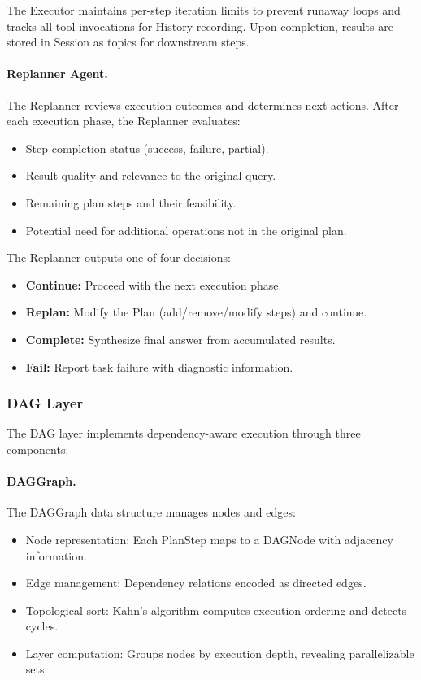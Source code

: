 \documentclass{article}
\theoremstyle{definition}
\begin{document}
The Executor maintains per-step iteration limits to prevent runaway loops and tracks all tool invocations for History recording. Upon completion, results are stored in Session as topics for downstream steps.

\paragraph{Replanner Agent.}
The Replanner reviews execution outcomes and determines next actions. After each execution phase, the Replanner evaluates:
\begin{itemize}[leftmargin=1.5em]
    \item Step completion status (success, failure, partial).
    \item Result quality and relevance to the original query.
    \item Remaining plan steps and their feasibility.
    \item Potential need for additional operations not in the original plan.
\end{itemize}

The Replanner outputs one of four decisions:
\begin{itemize}[leftmargin=1.5em]
    \item \textbf{Continue:} Proceed with the next execution phase.
    \item \textbf{Replan:} Modify the Plan (add/remove/modify steps) and continue.
    \item \textbf{Complete:} Synthesize final answer from accumulated results.
    \item \textbf{Fail:} Report task failure with diagnostic information.
\end{itemize}

\subsubsection{DAG Layer}

The DAG layer implements dependency-aware execution through three components:

\paragraph{DAGGraph.}
The DAGGraph data structure manages nodes and edges:
\begin{itemize}[leftmargin=1.5em]
    \item Node representation: Each PlanStep maps to a DAGNode with adjacency information.
    \item Edge management: Dependency relations encoded as directed edges.
    \item Topological sort: Kahn's algorithm computes execution ordering and detects cycles.
    \item Layer computation: Groups nodes by execution depth, revealing parallelizable sets.
\end{itemize}
\end{document}
